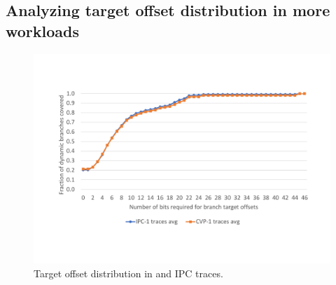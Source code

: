 


\subsection{Analyzing target offset distribution in more workloads}

\begin{figure}
\centering
\includegraphics[width=\columnwidth, trim=70 90 60 100, clip]{figures/CVP-IPC.pdf}
\caption{Target offset distribution in  and IPC traces.}
\label{hpca:fig:cvp_res}
\end{figure}

